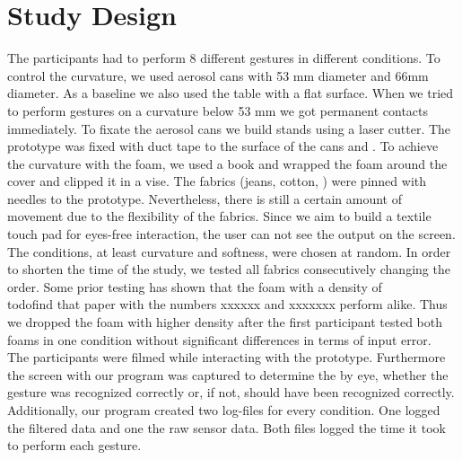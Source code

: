\section{Study Design}
The participants had to perform 8 different gestures in different conditions. To control the curvature, we used aerosol cans with 53 mm diameter and 66mm diameter. As a baseline we also used the table with a flat surface. When we tried to perform gestures on a curvature below 53 mm we got permanent contacts immediately. To fixate the aerosol cans we build stands using a laser cutter. The prototype was fixed with duct tape to the surface of the cans and . To achieve the curvature with the foam, we used a book and wrapped the foam around the cover and clipped it in a vise. The fabrics (jeans, cotton,  ) were pinned with needles to the prototype. Nevertheless, there is still a certain amount of movement due to the flexibility of the fabrics. Since we aim to build a textile touch pad for eyes-free interaction, the user can not see the output on the screen. \\

The conditions, at least curvature and softness, were chosen at random. In order to shorten the time of the study, we tested all fabrics consecutively changing the order. Some prior testing has shown that the foam with a density of \\todo{find that paper with the numbers} xxxxxx and xxxxxxx perform alike. Thus we dropped the  foam with higher density after the first participant tested both foams in one condition without significant differences in terms of input error. \\

The participants were filmed while interacting with the prototype. Furthermore the screen with our program was captured to determine the by eye, whether the gesture was recognized correctly or, if not, should have been recognized correctly. Additionally, our program created two log-files for every condition. One logged the filtered data and one the raw sensor data. Both files logged the time it took to perform each gesture.

